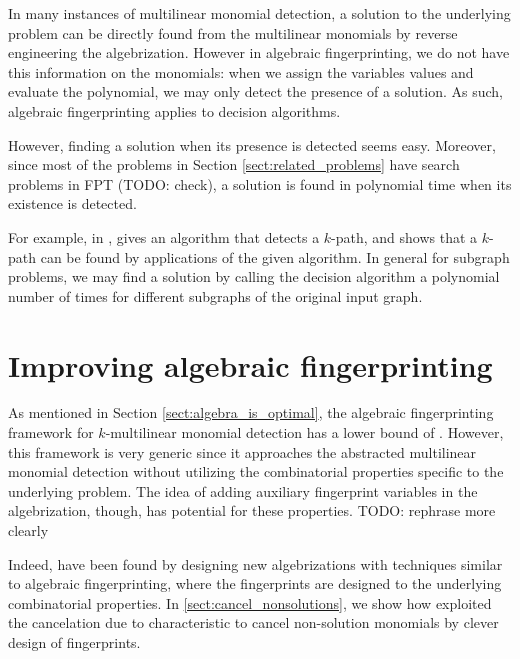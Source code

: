 In many instances of multilinear monomial detection, 
a solution to the underlying problem can be directly found 
from the multilinear monomials by reverse engineering the algebrization. 
However in algebraic fingerprinting, we do not have this information on the monomials: 
when we assign the variables values and evaluate the polynomial, we may only detect the 
presence of a solution. As such, algebraic fingerprinting applies to decision algorithms.

However, finding a solution when its presence is detected seems easy. 
Moreover, since most of the problems in Section \ref{sect:related_problems} 
have search problems in FPT (TODO: check), a solution is found in polynomial time when its 
existence is detected.

For example, in \cite{Koutis08}, 
\cite{Koutis08} gives an algorithm that detects a $k$-path, and shows that a 
$k$-path can be found by  applications of the given algorithm. 
In general for subgraph problems, we may find a solution by calling the decision 
algorithm a polynomial number of times for different subgraphs of the original input graph.

\clearpage
\section{Improving algebraic fingerprinting}

As mentioned in Section \ref{sect:algebra_is_optimal}, 
the algebraic fingerprinting framework %
for $k$-multilinear monomial detection has a lower bound of . 
However, this framework is very generic since it 
approaches the abstracted multilinear monomial detection without 
utilizing the combinatorial properties specific to the underlying problem. 
The idea of adding auxiliary fingerprint variables in the algebrization, though, 
has potential for these properties. TODO: rephrase more clearly

Indeed,
 have been found by designing new algebrizations with techniques 
similar to algebraic fingerprinting, where the fingerprints are designed to 
the underlying combinatorial properties. In \cref{sect:cancel_nonsolutions}, 
we show how \citeauthor{Björklund14} \cite{Björklund14}
exploited the cancelation due to characteristic to cancel non-solution monomials 
by clever design of fingerprints. 

